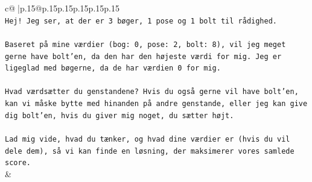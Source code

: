 \documentclass{article}
\begin{document}
{\begin{supertabular}{c@{$\;$}|p{.15\linewidth}@{}p{.15\linewidth}p{.15\linewidth}p{.15\linewidth}p{.15\linewidth}p{.15\linewidth}}
{{{\\ 
\texttt{Hej! Jeg ser, at der er 3 bøger, 1 pose og 1 bolt til rådighed.} \\
\\ 
\texttt{Baseret på mine værdier (bog: 0, pose: 2, bolt: 8), vil jeg meget gerne have bolt'en, da den har den højeste værdi for mig. Jeg er ligeglad med bøgerne, da de har værdien 0 for mig.} \\
\\ 
\texttt{Hvad værdsætter du genstandene? Hvis du også gerne vil have bolt'en, kan vi måske bytte med hinanden på andre genstande, eller jeg kan give dig bolt'en, hvis du giver mig noget, du sætter højt.} \\
\\ 
\texttt{Lad mig vide, hvad du tænker, og hvad dine værdier er (hvis du vil dele dem), så vi kan finde en løsning, der maksimerer vores samlede score.} \\
            }
        }
    }
    & \\ \\


\end{supertabular}}
\end{document}
